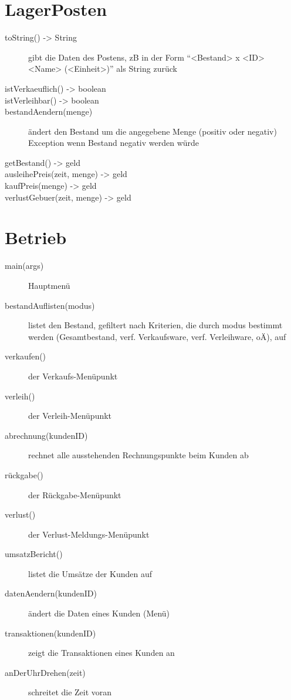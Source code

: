 \documentclass[a4paper,12pt]{book}
\begin{document}
\section{LagerPosten}
\begin{description}
\item[toString() -> String]
gibt die Daten des Postens, zB in der Form \enquote{<Bestand> x <ID> <Name> (<Einheit>)} als String zurück
\item[istVerkaeuflich() -> boolean]
\item[istVerleihbar() -> boolean]
\item[bestandAendern(menge)]
ändert den Bestand um die angegebene Menge (positiv oder negativ) \\
Exception wenn Bestand negativ werden würde
\item[getBestand() -> geld]
\item[ausleihePreis(zeit, menge) -> geld]
\item[kaufPreis(menge) -> geld]
\item[verlustGebuer(zeit, menge) -> geld]
\end{description}
\section{Betrieb}
\begin{description}
\item[main(args)]
Hauptmenü
\item[bestandAuflisten(modus)]
listet den Bestand, gefiltert nach Kriterien, die durch modus bestimmt werden (Gesamtbestand, verf. Verkaufsware, verf. Verleihware, oÄ), auf
\item[verkaufen()]
der Verkaufs-Menüpunkt
\item[verleih()]
der Verleih-Menüpunkt
\item[abrechnung(kundenID)]
rechnet alle ausstehenden Rechnungspunkte beim Kunden ab
\item[rückgabe()]
der Rückgabe-Menüpunkt
\item[verlust()]
der Verlust-Meldungs-Menüpunkt
\item[umsatzBericht()]
listet die Umsätze der Kunden auf
\item[datenAendern(kundenID)]
ändert die Daten eines Kunden (Menü)
\item[transaktionen(kundenID)]
zeigt die Transaktionen eines Kunden an
\item[anDerUhrDrehen(zeit)]
schreitet die Zeit voran
\end{description}
\end{document}
